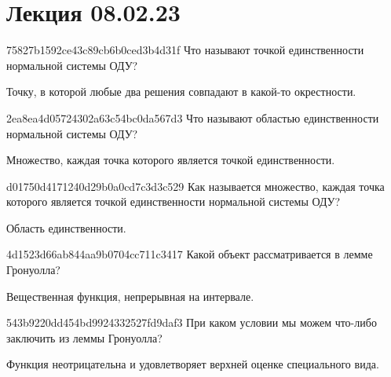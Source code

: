 


\section{Лекция 08.02.23}
\begin{note}{75827b1592ce43c89cb6b0ced3b4d31f}
    Что называют точкой единственности нормальной системы ОДУ?

    \begin{cloze}{1}
        Точку, в которой любые два решения совпадают в какой-то окрестности.
    \end{cloze}
\end{note}

\begin{note}{2ea8ea4d05724302a63c54bc0da567d3}
    Что называют областью единственности нормальной системы ОДУ?

    \begin{cloze}{1}
        Множество, каждая точка которого является точкой единственности.
    \end{cloze}
\end{note}

\begin{note}{d01750d4171240d29b0a0cd7c3d3c529}
    Как называется множество, каждая точка которого является точкой единственности нормальной системы ОДУ?

    \begin{cloze}{1}
        Область единственности.
    \end{cloze}
\end{note}

\begin{note}{4d1523d66ab844aa9b0704cc711c3417}
    Какой объект рассматривается в лемме Гронуолла?

    \begin{cloze}{1}
        Вещественная функция, непрерывная на интервале.
    \end{cloze}
\end{note}

\begin{note}{543b9220dd454bd9924332527fd9daf3}
    При каком условии мы можем что-либо заключить из леммы Гронуолла?

    \begin{cloze}{1}
        Функция неотрицательна и удовлетворяет верхней оценке специального вида.
    \end{cloze}
\end{note}


